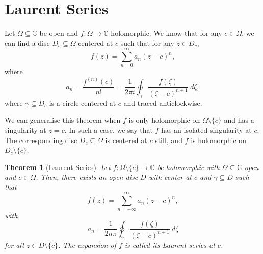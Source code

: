 \documentclass[a4paper, openany]{memoir}
\theoremstyle{definition}
\theoremstyle{plain}
\newtheorem{theorem}[definition]{Theorem}
\begin{document}
\section{Laurent Series}
Let $\Omega \subseteq \mathbb{C}$ be open and $f: \Omega \to \mathbb{C}$ holomorphic. We know that for any $c \in \Omega$, we can find a disc $D_c \subseteq \Omega$ centered at $c$ such that for any $z \in D_c$,
\[f(z) = \sum_{n=0}^\infty a_n (z - c)^n,\]
where
\[a_n = \frac{f^{(n)}(c)}{n!} = \frac{1}{2\pi i} \oint_\gamma \frac{f(\zeta)}{(\zeta - c)^{n+1}} \ d\zeta,\]
where $\gamma \subseteq D_c$ is a circle centered at $c$ and traced anticlockwise.

We can generalise this theorem when $f$ is only holomorphic on $\Omega \setminus \{c\}$ and has a singularity at $z = c$. In such a case, we say that $f$ has an isolated singularity at $c$. The corresponding disc $D_c \subseteq \Omega$ is centered at $c$ still, and $f$ is holomorphic on $D_c \setminus \{c\}$.
\begin{theorem}[Laurent Series]
Let $f: \Omega \setminus \{c\} \to \mathbb{C}$ be holomorphic with $\Omega \subseteq \mathbb{C}$ open and $c \in \Omega$. Then, there exists an open disc $D$ with center at $c$ and $\gamma \subseteq D$ such that
\[f(z) = \sum_{n=-\infty}^{\infty} a_n (z - c)^n,\]
with
\[a_n = \frac{1}{2n\pi} \oint_\gamma \frac{f(\zeta)}{(\zeta - c)^{n+1}} \ d\zeta\]
for all $z \in D \setminus \{c\}$. The expansion of $f$ is called its Laurent series at $c$.
\end{theorem}
\end{document}
